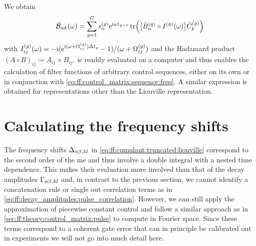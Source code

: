 We obtain
\begin{equation}\label{eq:ff:control_matrix:pulse:freq:ff:calculation}
    \tilde{\mathcal{B}}_{\alpha k}(\omega) = \sum_{g = 1}^G s_\alpha^{(g)}\mathrm{e}^{\mathrm{i}\omega t_{g-1}}\tr(\bigl[\bar{B}_\alpha^{(g)}\circ I^{(g)}(\omega)\bigr]\bar{C}_k^{(g)})
\end{equation}
with $I_{ij}^{(g)}(\omega) = -\mathrm{i}(\mathrm{e}^{\mathrm{i}(\omega + \Omega_{ij}^{(g)})\Delta t_g} - 1)/(\omega + \Omega_{ij}^{(g)})$ and the Hadamard product $(A\circ B)_{ij}\coloneqq A_{ij}\times B_{ij}$.
 is readily evaluated on a computer and thus enables the calculation of filter functions of arbitrary control sequences, either on its own or in conjunction with \cref{eq:ff:control_matrix:sequence:freq}.
A similar expression is obtained for representations other than the Liouville representation.

\section{Calculating the frequency shifts}\label{sec:ff:theory:frequency_shifts}
The frequency shifts $\Delta_{\alpha\beta,kl}$ in \cref{eq:ff:cumulant:truncated:liouville} correspond to the second order of the \gls{me} and thus involve a double integral with a nested time dependence.
This makes their evaluation more involved than that of the decay amplitudes $\Gamma_{\alpha\beta,kl}$ and, in contrast to the previous section, we cannot identify a concatenation rule or single out correlation terms as in \cref{eq:ff:decay_amplitudes:pulse_correlation}.
However, we can still apply the approximation of piecewise constant control and follow a similar approach as in \cref{sec:ff:theory:control_matrix:pulse} to compute \freqshifts in Fourier space.
Since these terms correspond to a coherent gate error that can in principle be calibrated out in experiments we will not go into much detail here.

